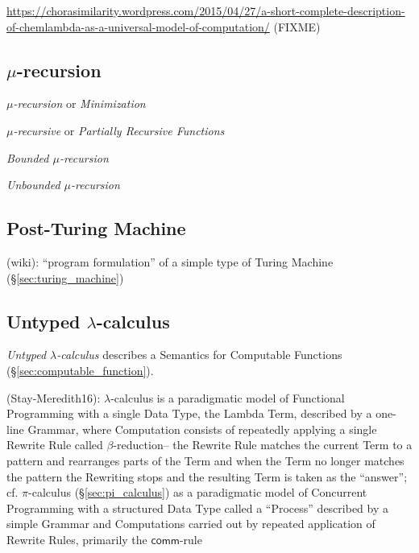 \asterism

\url{https://chorasimilarity.wordpress.com/2015/04/27/a-short-complete-description-of-chemlambda-as-a-universal-model-of-computation/}
(FIXME)



\subsection{$\mu$-recursion}\label{sec:mu_recursion}

\emph{$\mu$-recursion} or \emph{Minimization}

\emph{$\mu$-recursive} or \emph{Partially Recursive Functions}

\emph{Bounded $\mu$-recursion}

\emph{Unbounded $\mu$-recursion}



\subsection{Post-Turing Machine}\label{sec:post_turing}

(wiki): ``program formulation'' of a simple type of Turing Machine
(\S\ref{sec:turing_machine})



\subsection{Untyped $\lambda$-calculus}\label{sec:untyped_lambda}

\emph{Untyped $\lambda$-calculus} describes a Semantics for Computable
Functions (\S\ref{sec:computable_function}).

(Stay-Meredith16): $\lambda$-calculus is a paradigmatic model of Functional
Programming with a single Data Type, the Lambda Term, described by a one-line
Grammar, where Computation consists of repeatedly applying a single Rewrite Rule
called $\beta$-reduction-- the Rewrite Rule matches the current Term to a
pattern and rearranges parts of the Term and when the Term no longer matches the
pattern the Rewriting stops and the resulting Term is taken as the ``answer'';
cf. $\pi$-calculus (\S\ref{sec:pi_calculus}) as a paradigmatic model of
Concurrent Programming with a structured Data Type called a ``Process''
described by a simple Grammar and Computations carried out by repeated
application of Rewrite Rules, primarily the $\mathsf{comm}$-rule

